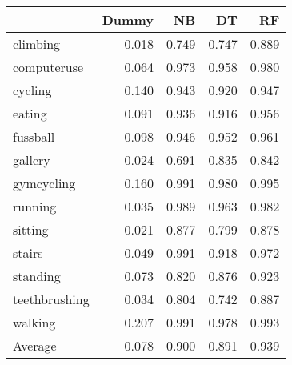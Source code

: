 \begin{tabular}{lrrrr}
\toprule
{} &  Dummy &    NB &    DT &    RF \\
\midrule
climbing      &  0.018 & 0.749 & 0.747 & 0.889 \\
computeruse   &  0.064 & 0.973 & 0.958 & 0.980 \\
cycling       &  0.140 & 0.943 & 0.920 & 0.947 \\
eating        &  0.091 & 0.936 & 0.916 & 0.956 \\
fussball      &  0.098 & 0.946 & 0.952 & 0.961 \\
gallery       &  0.024 & 0.691 & 0.835 & 0.842 \\
gymcycling    &  0.160 & 0.991 & 0.980 & 0.995 \\
running       &  0.035 & 0.989 & 0.963 & 0.982 \\
sitting       &  0.021 & 0.877 & 0.799 & 0.878 \\
stairs        &  0.049 & 0.991 & 0.918 & 0.972 \\
standing      &  0.073 & 0.820 & 0.876 & 0.923 \\
teethbrushing &  0.034 & 0.804 & 0.742 & 0.887 \\
walking       &  0.207 & 0.991 & 0.978 & 0.993 \\
Average       &  0.078 & 0.900 & 0.891 & 0.939 \\
\bottomrule
\end{tabular}
